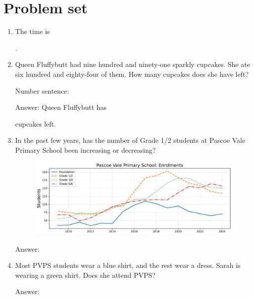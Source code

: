 \documentclass{tufte-book}
\begin{document}
\clearpage\section{Problem set }

\begin{enumerate}

\item {}
  The time is \dotfill\bigskip\par\dotfill\bigskip.
  
\item Queen Fluffybutt had nine hundred and ninety-one sparkly cupcakes. She ate six hundred and eighty-four of them. How many cupcakes does she have left?\medskip\par
Number sentence: \dotfill\medskip\par
Answer: Queen Fluffybutt has 
\dotfill\medskip\par\mbox{}\dotfill\medskip\par\mbox{}\dotfill\bigskip
 cupcakes left.

\item In the past few years, has the number of Grade 1/2 students at Pascoe Vale Primary School been increasing or decreasing?\bigskip\par
  \begin{figure}[h]\includegraphics[width=1.3\textwidth]{fig/pvps_enrolments_grade.pdf}\end{figure}
  Answer: \dotfill\bigskip\par

\item Most PVPS students wear a blue shirt, and the rest wear a dress.
Sarah is wearing a green shirt. Does she attend PVPS?\bigskip\par
Answer: \dotfill\bigskip

\end{enumerate}
\end{document}
